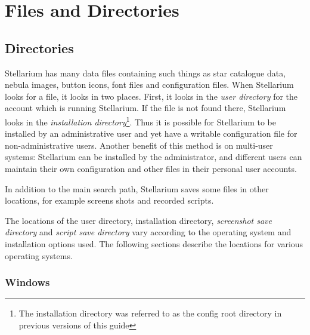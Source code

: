 
\chapter{Files and Directories}
\label{sec:FilesAndDirectories}

\section{Directories}
\label{sec:Directories}

Stellarium has many data files containing such things as star catalogue
data, nebula images, button icons, font files and configuration files.
When Stellarium looks for a file, it looks in two places. First, it
looks in the \emph{user directory} for the account which is running
Stellarium. If the file is not found there, Stellarium looks in the
\emph{installation directory}\footnote{The installation directory was
  referred to as the config root directory in previous versions of this
  guide}. Thus it is possible for Stellarium to be installed by an
administrative user and yet have a writable configuration file for
non-administrative users. Another benefit of this method is on
multi-user systems: Stellarium can be installed by the administrator,
and different users can maintain their own configuration and other files
in their personal user accounts.

In addition to the main search path, Stellarium saves some files in
other locations, for example screens shots and recorded scripts.

The locations of the user directory, installation directory,
\emph{screenshot save directory} and \emph{script save directory} vary
according to the operating system and installation options used. The
following sections describe the locations for various operating systems.

\subsection{Windows}
\label{sec:FilesAndDirectories:Windows}

